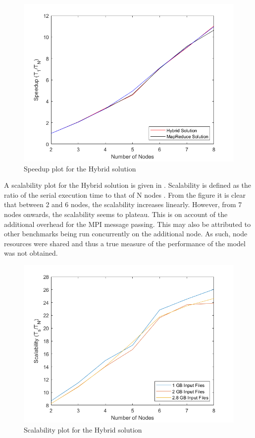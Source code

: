 \documentclass[12pt,twocolumn]{witseiepaper}
\begin{document}
\begin{figure}[h]
	\centering
	\includegraphics[width=1\columnwidth]{hybrid-speedup.png}
	\caption{Speedup plot for the Hybrid solution}
	\raggedright
	\label{fig:speedUpH}	
\end{figure}

A scalability plot for the Hybrid solution is given in . Scalability is defined as the ratio of the serial execution time to that of N nodes \cite{speedup}. From the figure it is clear that between 2 and 6 nodes, the scalability increases linearly. However, from 7 nodes onwards, the scalability seems to plateau. This is on account of the additional overhead for the MPI message passing. This may also be attributed to other benchmarks being run concurrently on the additional node. As such, node resources were shared and thus a true measure of the performance of the model was not obtained.

\begin{figure}[h]
	\centering
	\includegraphics[width=1\columnwidth]{scalability.png}
	\caption{Scalability plot for the Hybrid solution}
	\raggedright
	\label{fig:scalabilty}	
\end{figure}
\end{document}
